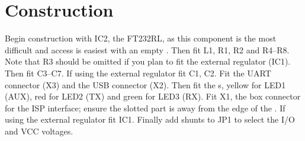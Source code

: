 \section{Construction}

Begin construction with IC2, the FT232RL, as this component is the
most difficult and access is easiest with an empty \pcb. Then fit L1,
R1, R2 and R4--R8. Note that R3 should be omitted if you plan to fit
the external  regulator (IC1). Then fit C3--C7. If using the
external regulator fit C1, C2. Fit the UART connector (X3) and the USB
connector (X2). Then fit the \led{}s, yellow for LED1 (AUX), red for
LED2 (TX) and green for LED3 (RX). Fit X1, the box connector for the
ISP interface; ensure the slotted part is away from the edge of the
\pcb. If using the external regulator fit IC1. Finally add shunts to
JP1 to select the I/O and VCC voltages.


